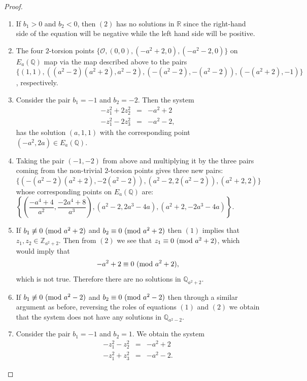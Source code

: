 \documentclass{article}
\newcommand{\R}{\mathbb{R}}
\newcommand{\Q}{\mathbb{Q}}
\newcommand{\Z}{\mathbb{Z}}
\theoremstyle{definition}
\begin{document}
\begin{proof}
\begin{enumerate}
    \item If $b_1 > 0$ and $b_2 < 0$, then $(2)$ has no solutions in $\R$ since the right-hand side of the equation will be negative while the left hand side will be positive.
    \item The four $2$-torsion points $\{\mathcal{O}, (0,0), (-a^2+2,0), (-a^2-2,0)\}$ on $E_a(\Q)$ map via the map described above to the pairs $\{(1,1), ((a^2-2)(a^2+2),a^2-2), (-(a^2-2),-(a^2-2)), (-(a^2+2),-1)\}$, respectively.
    \item Consider the pair $b_1 = -1$ and $b_2 = -2$. Then the system
    \begin{eqnarray*}
        -z_1^2 + 2z_2^2 &=& -a^2 + 2 \\
        -z_1^2 - 2z_3^2 &=& -a^2 - 2,
    \end{eqnarray*}
    has the solution $(a,1,1)$ with the corresponding point $(-a^2,2a) \in E_a(\Q)$.
    \item Taking the pair $(-1,-2)$ from above and multiplying it by the three pairs coming from the non-trivial $2$-torsion points gives three new pairs: $\{(-(a^2-2)(a^2+2), -2(a^2-2)), (a^2-2,2(a^2-2)),(a^2+2,2)\}$ whose corresponding points on $E_a(\Q)$ are: $\left\{ \left(\dfrac{-a^4+4}{a^2}, \dfrac{-2a^4+8}{a^3}\right), (a^2-2,2a^3-4a),(a^2+2,-2a^3-4a)\right\}$.
    \item If $b_1 \not\equiv 0 \textnormal{ (mod } a^2 + 2)$ and $b_2 \equiv 0 \textnormal{ (mod } a^2 + 2)$ then $(1)$ implies that $z_1,z_2 \in \Z_{a^2+2}$. Then from $(2)$ we see that $z_1 \equiv 0 \textnormal{ (mod } a^2+2)$, which would imply that 
    \begin{eqnarray*}
        -a^2 + 2 \equiv 0 \textnormal{ (mod }a^2+2),
    \end{eqnarray*}
    which is not true. Therefore there are no solutions in $\Q_{a^2+2}$.
    \item If $b_1 \not\equiv 0 \textnormal{ (mod } a^2 - 2)$ and $b_2 \equiv 0 \textnormal{ (mod } a^2 - 2)$ then through a similar argument as before, reversing the roles of equations $(1)$ and $(2)$ we obtain that the system does not have any solutions in $\Q_{a^2-2}$.
    \item Consider the pair $b_1 = -1$ and $b_2 = 1$. We obtain the system
    \begin{eqnarray*}
        -z_1^2 - z_2^2 &=& -a^2 + 2 \\
        -z_1^2 + z_3^2 &=& -a^2 - 2.
    \end{eqnarray*}

\end{enumerate}
\end{proof}
\end{document}
